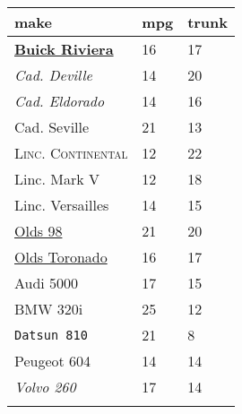 \documentclass{article}
\begin{document}
\begin{table}[tbp] \centering%
\begin{tabularx}{\textwidth}{lCC}
\toprule
make&mpg&trunk \tabularnewline
\midrule\addlinespace[1.5ex]
\underline{\textbf{Buick Riviera}}&16&17 \tabularnewline
\textsl{Cad. Deville}&14&20 \tabularnewline
\textit{Cad. Eldorado}&14&16 \tabularnewline
Cad. Seville&21&13 \tabularnewline
\textsc{Linc. Continental}&12&22 \tabularnewline
\textsf{Linc. Mark V}&12&18 \tabularnewline
Linc. Versailles&14&15 \tabularnewline
\underline{Olds 98}&21&20 \tabularnewline
\underline{Olds Toronado}&16&17 \tabularnewline
Audi 5000&17&15 \tabularnewline
BMW 320i&25&12 \tabularnewline
\texttt{Datsun 810}&21&8 \tabularnewline
Peugeot 604&14&14 \tabularnewline
\emph{Volvo 260}&17&14 \tabularnewline
\bottomrule \addlinespace[1.5ex]
\end{tabularx}%
\end{table}%
\end{document}
